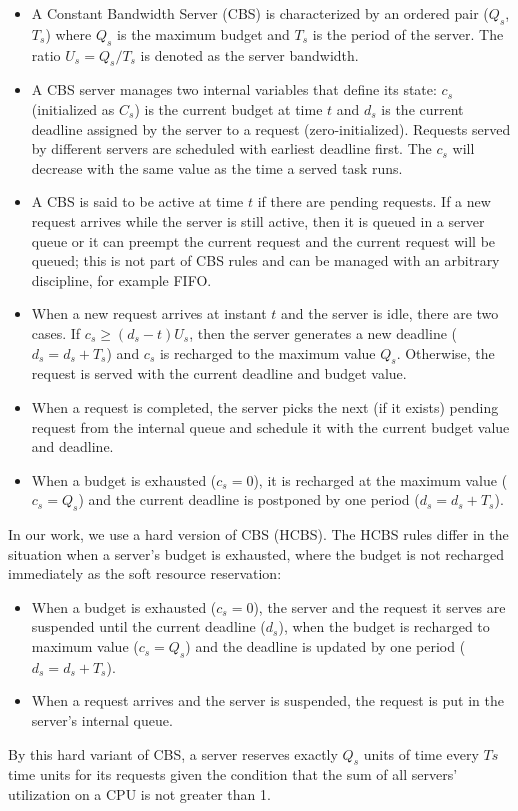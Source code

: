 \begin{itemize}
\item A Constant Bandwidth Server (CBS) is characterized by an ordered pair
($Q_{s}$, $T_{s}$) where $Q_{s}$ is the maximum budget and $T_{s}$ is the
period of the server. The ratio $U_{s} = Q_{s}/T_{s}$ is denoted as the
server bandwidth. 
\item A CBS server manages two internal variables that define its state:
$c_{s}$ (initialized as $C_{s}$) is the current budget at time $t$ 
and $d_{s}$ is the current deadline assigned by the 
server to a request (zero-initialized). Requests served by different 
servers are scheduled with earliest deadline first. The $c_{s}$ will
decrease with the same value as the time a served task runs. 
\item A CBS is said to be active at time $t$ if there are pending 
requests. If a new request arrives while the server is still active,
then it is queued in a server queue or it can preempt the current 
request and the current request will be queued; this is not part of 
CBS rules and can be managed with an arbitrary discipline, 
for example FIFO. 
\item When a new request arrives at instant $t$ and the server is idle, 
there are two cases. If $c_{s} \ge (d_{s} - t)U_{s}$, then the server 
generates a new deadline ($d_{s} = d_{s} + T_{s}$) and $c_{s}$ is 
recharged to the maximum value $Q_{s}$. Otherwise, the request is 
served with the current deadline and budget value.
\item When a request is completed, the server picks the next (if it exists)
pending request from the internal queue and schedule it with the current
budget value and deadline.
\item When a budget is exhausted ($c_{s} = 0$), it is recharged at the
maximum value ($c_{s} = Q_{s}$) and the current deadline is postponed by
one period ($d_{s} = d_{s} + T_{s}$).
\end{itemize}
In our work, we use a hard version of CBS (HCBS). The HCBS rules differ 
in the situation when a server's budget is exhausted, where the budget is 
not recharged immediately as the soft resource reservation:
\begin{itemize}
\item When a budget is exhausted ($c_{s} = 0$), the server and the request
it serves are suspended until the current deadline ($d_{s}$), when the 
budget is recharged to maximum value ($c_{s} = Q_{s}$) and the deadline 
is updated by one period ($d_{s} = d_{s} + T_{s}$).
\item When a request arrives and the server is suspended, the request is
put in the server's internal queue.
\end{itemize}
By this hard variant of CBS, a server reserves exactly $Q_{s}$ units
of time every $T{s}$ time units for its requests given the condition
that the sum of all servers' utilization on a CPU is not greater than 
1.

